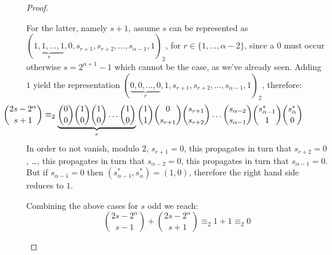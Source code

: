 \begin{proof}
\begin{itemize}
\begin{itemize}
                For the latter, namely $s+1$, assume $s$ can be represented as 
                $(\underbrace{1,1,\ldots,1}_{r},0,s_{r+1},s_{r+2},\ldots,s_{{\alpha}-1},1)_{2}$, for
                $r\in\lbrace1,\ldots,{\alpha}-2\rbrace$, since a $0$ must occur otherwise $s=2^{{\alpha}+1}-1$
                which cannot be the case, as we've already seen.  Adding $1$ yield the representation
                $(\underbrace{0,0,\ldots,0}_{r},1,s_{r+1},s_{r+2},\ldots,s_{{\alpha}-1},1)_{2}$, therefore:
                \begin{displaymath}
                    \hspace{-2cm}
                    {{2s-2^{{\alpha}}}\choose{s+1}} 
                    \equiv_{2} 
                    \underbrace{
                        {{0}\choose{0}} 
                        {{1}\choose{0}}
                        {{1}\choose{0}}
                        \ldots
                        {{1}\choose{0}}
                    }_{r}
                    {{1}\choose{1}}
                    {{0}\choose{s_{r+1}}}
                    {{s_{r+1}}\choose{s_{r+2}}}
                    \ldots
                    {{s_{{\alpha}-2}}\choose{s_{{\alpha}-1}}}
                    {{s_{{\alpha}-1}^{*}}\choose{1}}
                    {{s_{{\alpha}}^{*}}\choose{0}}
                \end{displaymath}
                In order to not vanish, modulo $2$, 
                $s_{r+1}=0$, this propagates in turn that $s_{r+2}=0$, \ldots, 
                this propagates in turn that $s_{{\alpha}-2}=0$,
                this propagates in turn that $s_{{\alpha}-1}=0$. But if $s_{{\alpha}-1}=0$
                then $(s_{{\alpha}-1}^{*},s_{{\alpha}}^{*})=(1,0)$, therefore the right
                hand side reduces to $1$.

                Combining the above cases for $s$ odd we reach:
                \begin{displaymath}
                        {{2s-2^{{\alpha}}}\choose{s-1}}+{{2s-2^{{\alpha}}}\choose{s+1}} \equiv_{2} 1+1\equiv_{2} 0
                \end{displaymath}
        \end{itemize}


\end{itemize}
\end{proof}
